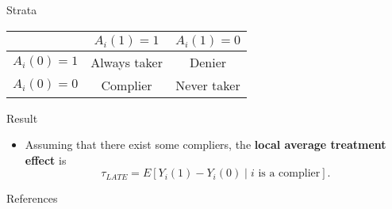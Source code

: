 \documentclass[handout]{beamer} %
\begin{document}
\begin{frame}{Strata}

  \begin{center}
    \begin{tabular}{rcc}
      \toprule
        & $A_i(1) = 1$ & $A_i(1) = 0$ \\
      \midrule
      $A_i(0) = 1$ & Always taker & Denier \\
      $A_i(0) = 0$ & Complier     & Never taker\\
      \bottomrule
    \end{tabular}
  \end{center}
  
\end{frame}

\begin{frame}{Result}

  \begin{itemize}
    \item Assuming that there exist some compliers, the \textbf{local average
      treatment effect} is
      \[\tau_{LATE} = E[Y_i(1) - Y_i(0) \mid i \text{ is a complier}].\]
  \end{itemize}
  
\end{frame}

\begin{frame}[allowframebreaks]{References}

  \printbibliography
  
\end{frame}
\end{document}
